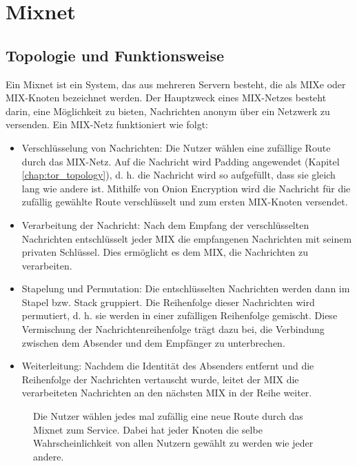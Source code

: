 \section{Mixnet}
\label{chap:mixnet}

\subsection{Topologie und Funktionsweise}
\label{chap:mixnet_topology}

Ein Mixnet ist ein System, das aus mehreren Servern besteht, die als MIXe oder MIX-Knoten bezeichnet werden.  Der Hauptzweck eines MIX-Netzes besteht darin, eine Möglichkeit zu bieten, Nachrichten anonym über ein Netzwerk zu versenden.
Ein MIX-Netz funktioniert wie folgt:

\begin{itemize}
    \item Verschlüsselung von Nachrichten: Die Nutzer wählen eine zufällige Route durch das MIX-Netz. Auf die Nachricht wird Padding angewendet (Kapitel \ref{chap:tor_topology}), d. h. die Nachricht wird so aufgefüllt, dass sie gleich lang wie andere ist. Mithilfe von Onion Encryption wird die Nachricht für die zufällig gewählte Route verschlüsselt und zum ersten MIX-Knoten versendet\cite{OnionEncryptionMixnet}.
    \item Verarbeitung der Nachricht: Nach dem Empfang der verschlüsselten Nachrichten entschlüsselt jeder MIX die empfangenen Nachrichten mit seinem privaten Schlüssel. Dies ermöglicht es dem MIX, die Nachrichten zu verarbeiten.
    \item Stapelung und Permutation: Die entschlüsselten Nachrichten werden dann im Stapel bzw. Stack gruppiert. Die Reihenfolge dieser Nachrichten wird permutiert, d. h. sie werden in einer zufälligen Reihenfolge gemischt. Diese Vermischung der Nachrichtenreihenfolge trägt dazu bei, die Verbindung zwischen dem Absender und dem Empfänger zu unterbrechen.
    \item Weiterleitung: Nachdem die Identität des Absenders entfernt und die Reihenfolge der Nachrichten vertauscht wurde, leitet der MIX die verarbeiteten Nachrichten an den nächsten MIX in der Reihe weiter.
\end{itemize}

\begin{figure}[h!]
    \centering
    
    \caption{Die Nutzer wählen jedes mal zufällig eine neue Route durch das Mixnet zum Service. Dabei hat jeder Knoten die selbe Wahrscheinlichkeit von allen Nutzern gewählt zu werden wie jeder andere.}
    \label{imgs:mixnet}
\end{figure}

